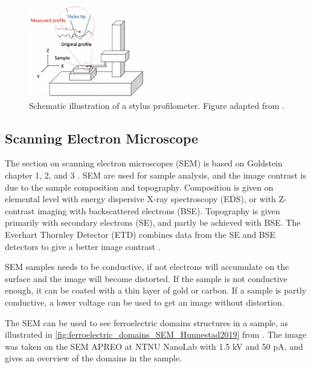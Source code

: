 \begin{figure}[ht]
    \centering
    \includegraphics[width=0.45\textwidth]{figures/profilometer.png}
    \caption{Schematic illustration of a stylus profilometer. Figure adapted from \cite{profilometer_manual}.}
    \label{fig:stylus_profilometer}
\end{figure}


\subsection{Scanning Electron Microscope}

\noindent The section on scanning electron microscopes (SEM) is based on Goldstein chapter 1, 2, and 3 \cite{goldstein_scanning_2018}.
SEM are used for sample analysis, and the image contrast is due to the sample composition and topography.
Composition is given on elemental level with energy dispersive X-ray spectroscopy (EDS), or with Z-contrast imaging with backscattered electrons (BSE).
Topography is given primarily with secondary electrons (SE), and partly be achieved with BSE.
The Everhart Thornley Detector (ETD) combines data from the SE and BSE detectors to give a better image contrast \cite{T_Everhart_1960}.


SEM samples needs to be conductive, if not electrons will accumulate on the surface and the image will become distorted.
If the sample is not conductive enough, it can be coated with a thin layer of gold or carbon.
If a sample is partly conductive, a lower voltage can be used to get an image without distortion.

The SEM can be used to see ferroelectric domains structures in a sample, as illustrated in \autoref{fig:ferroelectric_domains_SEM_Hunnestad2019} from \cite{hunnestad_visualizing_2019}.
The image was taken on the SEM APREO at NTNU NanoLab with 1.5 kV and 50 pA, and gives an overview of the domains in the sample.


